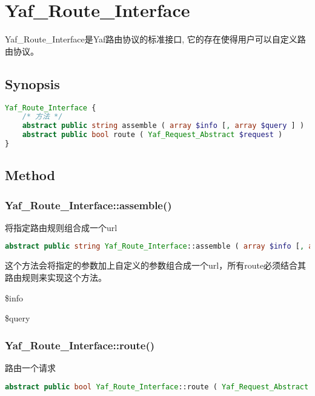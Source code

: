 \chapter{Yaf\_Route\_Interface}

Yaf\_Route\_Interface是Yaf路由协议的标准接口, 它的存在使得用户可以自定义路由协议。

\section{Synopsis}



\begin{lstlisting}[language=PHP]
Yaf_Route_Interface {
    /* 方法 */
    abstract public string assemble ( array $info [, array $query ] )
    abstract public bool route ( Yaf_Request_Abstract $request )
}
\end{lstlisting}

\section{Method}

\subsection{Yaf\_Route\_Interface::assemble()}

将指定路由规则组合成一个url



\begin{lstlisting}[language=PHP]
abstract public string Yaf_Route_Interface::assemble ( array $info [, array $query ] )
\end{lstlisting}

这个方法会将指定的参数加上自定义的参数组合成一个url，所有route必须结合其路由规则来实现这个方法。

\begin{compactitem}
\item \$info
\item \$query
\end{compactitem}




\subsection{Yaf\_Route\_Interface::route()}

路由一个请求


\begin{lstlisting}[language=PHP]
abstract public bool Yaf_Route_Interface::route ( Yaf_Request_Abstract $request )
\end{lstlisting}


